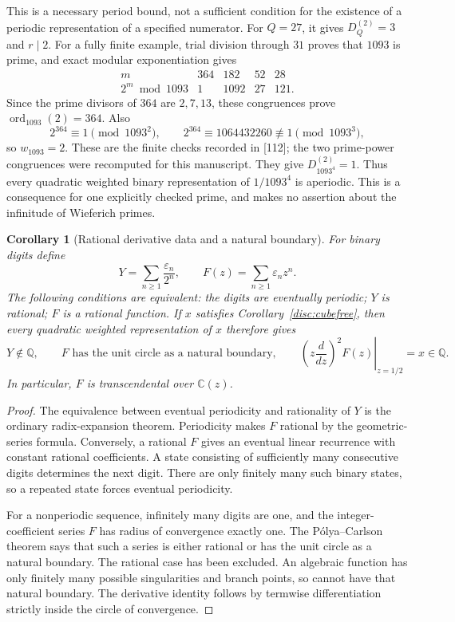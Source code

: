 \documentclass[11pt,a4paper]{article}
\newtheorem{corollary}[theorem]{Corollary}
\theoremstyle{definition}
\theoremstyle{remark}
\numberwithin{equation}{section}
\begin{document}
This is a necessary period bound, not a sufficient condition for the
existence of a periodic representation of a specified numerator.
For $Q=27$, it gives $D_Q^{(2)}=3$ and $r\mid2$.
For a fully finite example, trial division through $31$ proves that
$1093$ is prime, and exact modular exponentiation gives
\[
\begin{array}{c|rrrr}
m&364&182&52&28\\\hline
2^m\bmod1093&1&1092&27&121.
\end{array}
\]
Since the prime divisors of $364$ are $2,7,13$, these congruences
prove $\operatorname{ord}_{1093}(2)=364$.  Also
\[
2^{364}\equiv1\pmod{1093^2},\qquad
2^{364}\equiv1064432260\not\equiv1\pmod{1093^3},
\]
so $w_{1093}=2$.  These are the finite checks recorded in [112]; the
two prime-power congruences were recomputed for this manuscript.
They give $D_{1093^4}^{(2)}=1$.
Thus every quadratic weighted binary representation of
$1/1093^4$ is aperiodic.  This is a consequence for one explicitly
checked prime, and makes no assertion about the infinitude of
Wieferich primes.

\begin{corollary}[Rational derivative data and a natural boundary]
\label{disc:naturalboundary}
For binary digits define
\[
 Y=\sum_{n\ge1}\frac{\varepsilon_n}{2^n},\qquad
 F(z)=\sum_{n\ge1}\varepsilon_nz^n.
\]
The following conditions are equivalent: the digits are eventually
periodic; $Y$ is rational; $F$ is a rational function.
If $x$ satisfies Corollary~\ref{disc:cubefree}, then every quadratic
weighted representation of $x$ therefore gives
\[
 Y\notin\mathbb Q,
 \qquad F\text{ has the unit circle as a natural boundary},
 \qquad
 \left.\left(z\frac{d}{dz}\right)^2F(z)\right|_{z=1/2}
 =x\in\mathbb Q.
\]
In particular, $F$ is transcendental over $\mathbb C(z)$.
\end{corollary}

\begin{proof}
The equivalence between eventual periodicity and rationality of $Y$
is the ordinary radix-expansion theorem.  Periodicity makes $F$
rational by the geometric-series formula.  Conversely, a rational
$F$ gives an eventual linear recurrence with constant rational
coefficients.  A state consisting of sufficiently many consecutive
digits determines the next digit.  There are only finitely many such
binary states, so a repeated state forces eventual periodicity.

For a nonperiodic sequence, infinitely many digits are one, and the
integer-coefficient series $F$ has radius of convergence exactly one.
The P\'olya--Carlson theorem \cite{Bell2023} says that such a series is either rational
or has the unit circle as a natural boundary.  The rational case has
been excluded.  An algebraic function has only finitely many possible
singularities and branch points, so cannot have that natural boundary.
The derivative identity follows by termwise differentiation strictly
inside the circle of convergence.
\end{proof}
\end{document}
